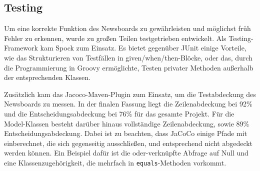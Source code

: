 \subsection{Testing}
Um eine korrekte Funktion des Newsboards zu gewährleisten und möglichst früh
Fehler zu erkennen, wurde zu großen Teilen testgetrieben entwickelt.
Als Testing-Framework kam Spock zum Einsatz. Es bietet gegenüber JUnit einige Vorteile,
wie das Strukturieren von Testfällen in given/when/then-Blöcke,
oder das, durch die Programmierung in Groovy ermöglichte, Testen privater Methoden
außerhalb der entsprechenden Klassen.

Zusätzlich kam das Jacoco-Maven-Plugin zum Einsatz, um die Testabdeckung des Newsboards
zu messen. In der finalen Fassung liegt die Zeilenabdeckung bei 92\%
und die Entscheidungsabdeckung bei 76\% für das gesamte Projekt.
Für die Model-Klassen besteht darüber hinaus vollständige Zeilenabdeckung,
sowie 89\% Entscheidungsabdeckung. Dabei ist zu beachten, dass JaCoCo einige Pfade
mit einberechnet, die sich gegenseitig ausschließen, und entsprechend
nicht abgedeckt werden können. Ein Beispiel dafür ist die oder-verknüpfte Abfrage
auf Null und eine Klassenzugehörigkeit, die mehrfach in \texttt{equals}-Methoden vorkommt.

